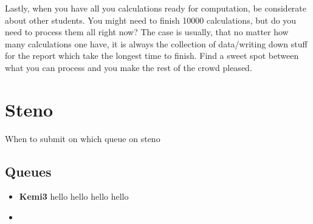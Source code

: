 \documentclass{article}
\begin{document}
Lastly, when you have all you calculations ready for computation, be considerate about other students.
You might need to finish 10000 calculations, but do you need to process them all right now?
The case is usually, that no matter how many calculations one have, it is always the collection of data/writing down stuff for the report which take the longest time to finish.
Find a sweet spot between what you can process and you make the rest of the crowd pleased.\\


\newpage
\section{Steno}

When to submit on which queue on steno

\subsection*{Queues}

\begin{itemize}

    \item {\bf Kemi3} 
        hello hello hello hello


    \item 

\end{itemize}



\end{document}
